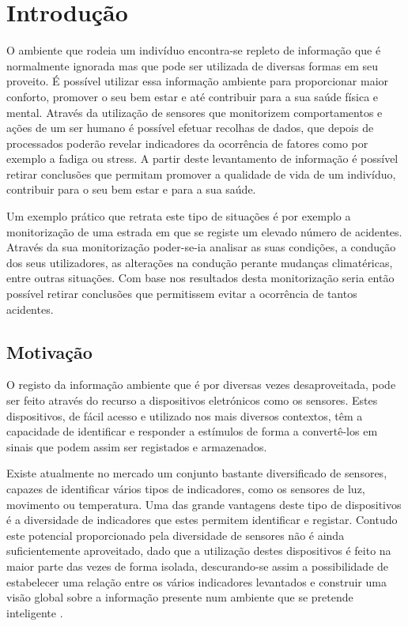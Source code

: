 \chapter{Introdução}

O ambiente que rodeia um indivíduo encontra-se repleto de informação que é normalmente ignorada mas que pode ser utilizada de diversas formas em seu proveito. É possível utilizar essa informação ambiente para proporcionar maior conforto, promover o seu bem estar e até contribuir para a sua saúde física e mental. Através da utilização de sensores que monitorizem comportamentos e ações de um ser humano é possível efetuar recolhas de dados, que depois de processados poderão revelar indicadores da ocorrência de fatores como por exemplo a fadiga ou stress. A partir deste levantamento de informação é possível retirar conclusões que permitam promover a qualidade de vida de um indivíduo, contribuir para o seu bem estar e para a sua saúde. 

Um exemplo prático que retrata este tipo de situações é por exemplo a monitorização de uma estrada em que se registe um elevado número de acidentes. Através da sua monitorização poder-se-ia analisar as suas condições, a condução dos seus utilizadores, as alterações na condução perante mudanças climatéricas, entre outras situações. Com base nos resultados desta monitorização seria então possível retirar conclusões que permitissem evitar a ocorrência de tantos acidentes.


\section{Motivação}
O registo da informação ambiente que é por diversas vezes desaproveitada, pode ser feito através do recurso a dispositivos eletrónicos como os sensores. Estes dispositivos, de fácil acesso e utilizado nos mais diversos contextos, têm a capacidade de identificar e responder a estímulos de forma a convertê-los em sinais que podem assim ser registados e armazenados\cite{akyildiz2002wireless}. 

Existe atualmente no mercado um conjunto bastante diversificado de sensores, capazes de identificar vários tipos de indicadores, como os sensores de luz, movimento ou temperatura. Uma das grande vantagens deste tipo de dispositivos é a diversidade de indicadores que estes permitem identificar e registar. Contudo este potencial proporcionado pela diversidade de sensores não é ainda suficientemente aproveitado, dado que a utilização destes dispositivos é feito na maior parte das vezes de forma isolada, descurando-se assim a possibilidade de estabelecer uma relação entre os vários indicadores levantados e construir uma visão global \cite{salber1999designing} sobre a informação presente num ambiente que se pretende inteligente \cite{ducatel2001scenarios, ducatel2003ambient}.

